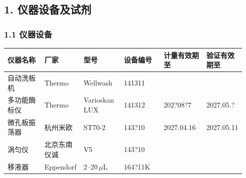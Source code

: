 \documentclass[UTF8,10pt,a4paper,fontset=fandol]{ctexart}
\newcommand{\fieldvalue}[1]{#1}
\newcommand{\handwritten}[1]{#1}
\begin{document}
\subsection{1. 仪器设备及试剂}

\subsubsection{1.1 仪器设备}

\begin{tabular}{|p{0.16\linewidth}|p{0.14\linewidth}|p{0.17\linewidth}|p{0.17\linewidth}|p{0.18\linewidth}|p{0.12\linewidth}|}
\hline
仪器名称 & 厂家 & 型号 & 设备编号 & 计量有效期至 & 验证有效期至 \\
\hline
自动洗板机 & Thermo & Wellwash &
\fieldvalue{\handwritten{141311}} & & \\
\hline
多功能酶标仪 & Thermo & Varioskan LUX &
\fieldvalue{\handwritten{141312}} &
\fieldvalue{\handwritten{202?08?7}} &
\fieldvalue{\handwritten{2027.05.?}} \\
\hline
微孔板振荡器 & 杭州米欧 & ST70-2 &
\fieldvalue{\handwritten{143?10}} &
\fieldvalue{\handwritten{2027.04.16}} &
\fieldvalue{\handwritten{2027.05.11}} \\
\hline
涡匀仪 & 北京东南仪诚 & V5 &
\fieldvalue{\handwritten{143?10}} & & \\
\hline
\multirow{4}{*}{移液器} & \multirow{4}{*}{Eppendorf} &
\fieldvalue{\handwritten{2--20\,\(\mu\)L}} &
\fieldvalue{\handwritten{164?11K}} &

\end{tabular}
\end{document}
